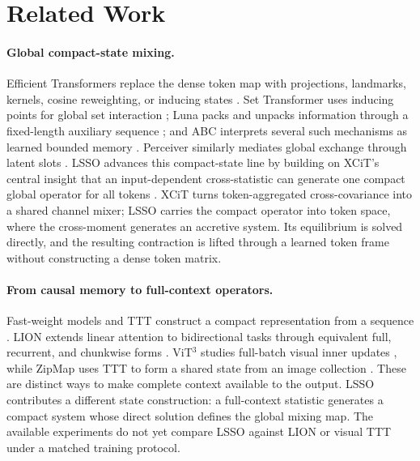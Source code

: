 \documentclass[10pt]{article}
\begin{document}
\section{Related Work}
\label{sec:related-work}

\paragraph{Global compact-state mixing.}
Efficient Transformers replace the dense token map with projections,
landmarks, kernels, cosine reweighting, or inducing states
\cite{wang2020linformer,katharopoulos2020linear,
choromanski2021performer,qin2022cosformer,xiong2021nystrom}.  Set Transformer uses inducing
points for global set interaction \cite{lee2019settransformer}; Luna packs and
unpacks information through a fixed-length auxiliary sequence
\cite{ma2021luna}; and ABC interprets several such mechanisms as learned
bounded memory \cite{peng2022abc}.  Perceiver similarly mediates global
exchange through latent slots \cite{jaegle2021perceiver}.  LSSO advances this
compact-state line by building on XCiT's central insight that an
input-dependent cross-statistic can generate one compact global operator for
all tokens \cite{ali2021xcit}.  XCiT turns token-aggregated cross-covariance
into a shared channel mixer; LSSO carries the compact operator into token
space, where the cross-moment generates an accretive system.  Its equilibrium
is solved directly, and the resulting contraction is lifted through a learned
token frame without constructing a dense token matrix.

\paragraph{From causal memory to full-context operators.}
Fast-weight models and TTT construct a compact representation from a sequence
\cite{schlag2021fastweights,sun2025ttt}.  LION extends linear attention to
bidirectional tasks through equivalent full, recurrent, and chunkwise forms
\cite{afzal2025lion}.  ViT$^3$ studies full-batch visual inner updates
\cite{han2026vit3}, while ZipMap uses TTT to form a shared state from an image
collection \cite{jin2026zipmap}.  These are distinct ways to make complete
context available to the output.  LSSO contributes a different state
construction: a full-context statistic generates a compact system whose direct
solution defines the global mixing map.  The available experiments do not yet
compare LSSO against LION or visual TTT under a matched training protocol.
\end{document}
